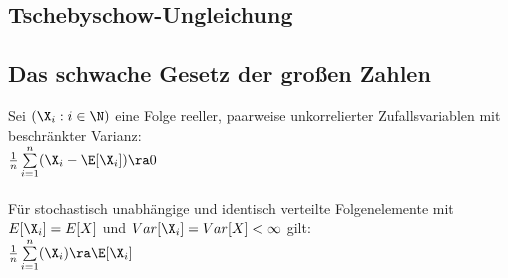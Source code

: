\documentclass[german,color,6pt]{latex4ei/latex4ei_sheet}
\begin{document}
\begin{sectionbox}
	\subsection{Tschebyschow-Ungleichung}


\end{sectionbox}
\begin{sectionbox}
	\subsection{Das schwache Gesetz der großen Zahlen}
	Sei $(\X_i : i \in \N)$ eine Folge reeller, paarweise unkorrelierter Zufallsvariablen mit beschränkter Varianz:\\
	$\frac{1}{n} \sum\limits_{i = 1}^n (\X_i - \E[\X_i]) \ra 0$\\ \\
	Für stochastisch unabhängige und identisch verteilte Folgenelemente mit $E[\X_i] = E[X]$ und $Var[\X_i] = Var[X] < \infty$ gilt: \\
	$\frac{1}{n} \sum\limits_{i = 1}^n (\X_i) \ra \E[\X_i] $
\end{sectionbox}
\end{document}
